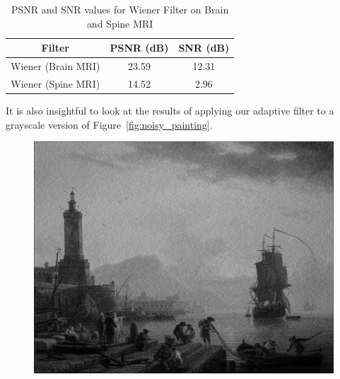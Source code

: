 \documentclass[hidelinks,12pt]{article}
\begin{document}
	\begin{table}[h!]
		\centering
		\begin{tabular}{|c|c|c|}
			\hline
			\textbf{Filter}       & \textbf{PSNR (dB)} & \textbf{SNR (dB)} \\
			\hline
			Wiener (Brain MRI)    & 23.59              & 12.31             \\
			Wiener (Spine MRI)    & 14.52              & 2.96              \\
			\hline
		\end{tabular}
		\caption{PSNR and SNR values for Wiener Filter on Brain and Spine MRI}
	\end{table}
	
	\pagebreak
	
	It is also insightful to look at the results of applying our adaptive filter to a grayscale version of Figure~\ref{fig:noisy_painting}.

	
	\begin{figure}[hb!]
		\centering
		\includegraphics[scale=0.3]{figures/adaptive/painting.jpg}
		\caption{}
	\end{figure}
	
	
\end{document}
